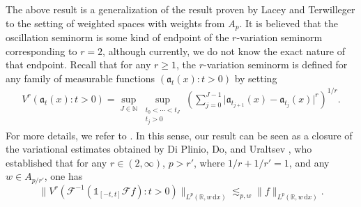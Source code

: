 \documentclass[11pt,oneside]{amsart}
\numberwithin{equation}{section}
\theoremstyle{definition}
\begin{document}
The above result is a generalization of the result proven by Lacey and Terwilleger \cite{LT} to the setting of weighted spaces with weights from $A_p$. It is believed that the oscillation seminorm is some kind of endpoint of the $r$-variation seminorm corresponding to $r=2$, although currently, we do not know the exact nature of that endpoint. Recall that for any $r \geq 1$, the $r$-variation seminorm is defined for any family of measurable functions $(\mathfrak{a}_t(x): t > 0)$ by setting
\begin{align*}
    V^{r}(\mathfrak{a}_t(x) : t > 0) = \sup_{J \in \mathbb{N}} \sup_{\substack{t_{0} < \cdots < t_{J} \\ t_{j} > 0}} \left( \sum_{j = 0}^{J-1} \big|\mathfrak{a}_{t_{j+1}}(x) - \mathfrak{a}_{t_j}(x)\big|^{r} \right)^{1/r}.
\end{align*}
For more details, we refer to \cite{MSS}. In this sense, our result can be seen as a closure of the variational estimates obtained by Di Plinio, Do, and Uraltsev \cite[Theorem 2]{DDU}, who established that for any $r \in (2, \infty)$, $p > r'$, where $1/r + 1/r' = 1$, and any $w \in A_{p/r'}$, one has
\begin{equation*}
    \big\|V^r(\mathcal{F}^{-1}(\mathds{1}_{[-t,t]}\mathcal{F} f) : t > 0)\big\|_{L^p(\mathbb{R}, w \, \mathrm{d}x)} \lesssim_{p, w} \|f\|_{L^p(\mathbb{R}, w \, \mathrm{d}x)}.
\end{equation*}
\end{document}
